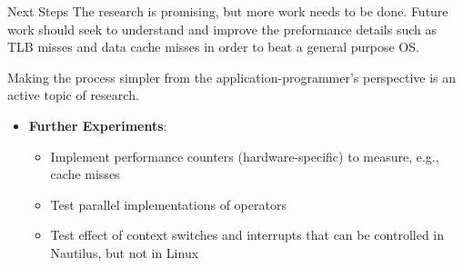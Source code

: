 \begin{block}{Next Steps}
    The research is promising, but more work needs to be done. Future work should seek to understand and improve the preformance details such as TLB misses and data cache misses in order to beat a general purpose OS.

Making the process simpler from the application-programmer's perspective is an active topic of research.

  \begin{itemize}
  \item \textbf{Further Experiments}:
    \begin{itemize}
    \item Implement performance counters (hardware-specific) to measure, e.g., cache misses
    \item Test parallel implementations of operators
    \item Test effect of context switches and interrupts that can be controlled in Nautilus, but not in Linux
  \end{itemize}
  \end{itemize}
\end{block}

